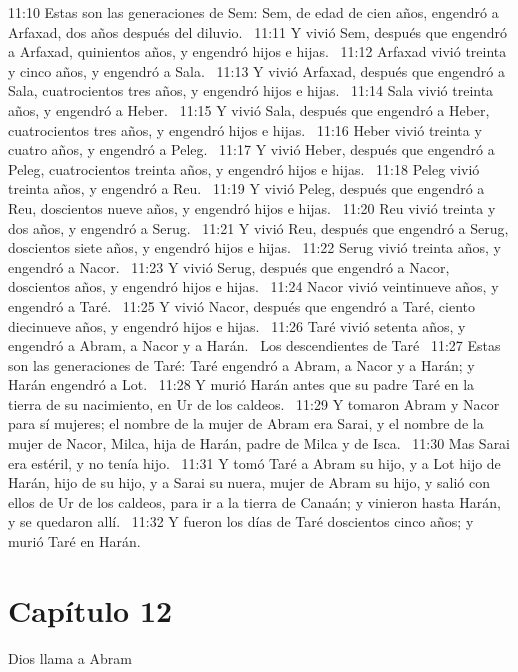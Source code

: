 11:10 Estas son las generaciones de Sem: Sem, de edad de cien años, engendró a Arfaxad, dos años después del diluvio.  
11:11 Y vivió Sem, después que engendró a Arfaxad, quinientos años, y engendró hijos e hijas.  
11:12 Arfaxad vivió treinta y cinco años, y engendró a Sala.  
11:13 Y vivió Arfaxad, después que engendró a Sala, cuatrocientos tres años, y engendró hijos e hijas.  
11:14 Sala vivió treinta años, y engendró a Heber.  
11:15 Y vivió Sala, después que engendró a Heber, cuatrocientos tres años, y engendró hijos e hijas.  
11:16 Heber vivió treinta y cuatro años, y engendró a Peleg.  
11:17 Y vivió Heber, después que engendró a Peleg, cuatrocientos treinta años, y engendró hijos e hijas.  
11:18 Peleg vivió treinta años, y engendró a Reu.  
11:19 Y vivió Peleg, después que engendró a Reu, doscientos nueve años, y engendró hijos e hijas.  
11:20 Reu vivió treinta y dos años, y engendró a Serug.  
11:21 Y vivió Reu, después que engendró a Serug, doscientos siete años, y engendró hijos e hijas.  
11:22 Serug vivió treinta años, y engendró a Nacor.  
11:23 Y vivió Serug, después que engendró a Nacor, doscientos años, y engendró hijos e hijas.  
11:24 Nacor vivió veintinueve años, y engendró a Taré.  
11:25 Y vivió Nacor, después que engendró a Taré, ciento diecinueve años, y engendró hijos e hijas.  
11:26 Taré vivió setenta años, y engendró a Abram, a Nacor y a Harán.  
Los descendientes de Taré  
11:27 Estas son las generaciones de Taré: Taré engendró a Abram, a Nacor y a Harán; y Harán engendró a Lot.  
11:28 Y murió Harán antes que su padre Taré en la tierra de su nacimiento, en Ur de los caldeos.  
11:29 Y tomaron Abram y Nacor para sí mujeres; el nombre de la mujer de Abram era Sarai, y el nombre de la mujer de Nacor, Milca, hija de Harán, padre de Milca y de Isca.  
11:30 Mas Sarai era estéril, y no tenía hijo.  
11:31 Y tomó Taré a Abram su hijo, y a Lot hijo de Harán, hijo de su hijo, y a Sarai su nuera, mujer de Abram su hijo, y salió con ellos de Ur de los caldeos, para ir a la tierra de Canaán; y vinieron hasta Harán, y se quedaron allí.  
11:32 Y fueron los días de Taré doscientos cinco años; y murió Taré en Harán.  
\section*{Capítulo 12}
Dios llama a Abram  

